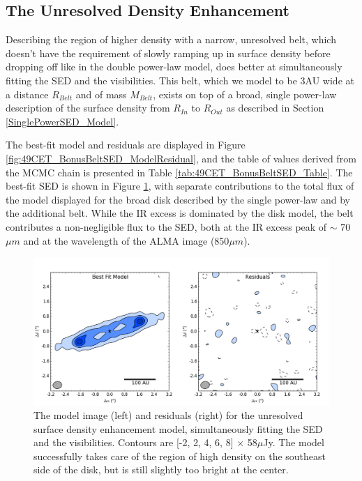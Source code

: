{{\subsection{The Unresolved Density Enhancement}
\label{UnresolvedDensitySED_Model}

Describing the region of higher density with a narrow, unresolved belt, which doesn't have the requirement of slowly ramping up in surface density before dropping off like in the double power-law model, does better at simultaneously fitting the SED and the visibilities. This belt, which we model to be 3AU wide at a distance $R_{Belt}$ and of mass $M_{Belt}$, exists on top of a broad, single power-law description of the surface density from $R_{In}$ to $R_{Out}$ as described in Section \ref{SinglePowerSED_Model}. 

The best-fit model and residuals are displayed in Figure \ref{fig:49CET_BonusBeltSED_ModelResidual}, and the table of values derived from the MCMC chain is presented in Table \ref{tab:49CET_BonusBeltSED_Table}. The best-fit SED is shown in Figure \ref{fig:49CET_BonusBeltSED_SED}, with separate contributions to the total flux of the model displayed for the broad disk described by the single power-law and by the additional belt. While the IR excess is dominated by the disk model, the belt contributes a non-negligible flux to the SED, both at the IR excess peak of $\sim$ 70$\mu m$ and at the wavelength of the ALMA image (850$\mu m$). 
\begin{figure}%
\label{fig:49CET_BonusBeltSED_SED}
\centering
\includegraphics[width = 1\textwidth]{49CET_BonusBeltSED_ModelResidual.png}
\caption{The model image (left) and residuals (right) for the unresolved surface density enhancement model, simultaneously fitting the SED and the visibilities. Contours are [-2, 2, 4, 6, 8] $\times$ 58$\mu$Jy. The model successfully takes care of the region of high density on the southeast side of the disk, but is still slightly too bright at the center.}

\end{figure}}}
